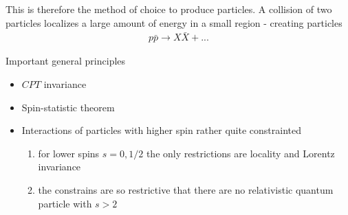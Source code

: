 \documentclass[10pt,a4paper]{article}
\theoremstyle{definition}
\begin{document}
This is therefore the method of choice to produce particles. A collision of two particles localizes a large amount of energy in a small region - creating particles
\begin{align}
    p\bar{p}\rightarrow X\bar{X}+ ...
\end{align}

Important general principles
\begin{itemize}
    \item $CPT$ invariance
    \item Spin-statistic theorem
    \item Interactions of particles with higher spin rather quite constrainted
    \begin{enumerate}
        \item for lower spins $s=0, 1/2$ the only restrictions are locality and Lorentz invariance
        \item the constrains are so restrictive that there are no relativistic quantum particle with $s>2$
    \end{enumerate}
\end{itemize}

\newpage 
\end{document}
